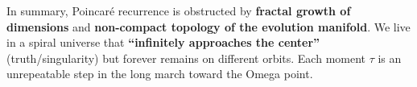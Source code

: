 In summary, Poincar\'{e} recurrence is obstructed by \textbf{fractal growth of dimensions} and \textbf{non-compact topology of the evolution manifold}. We live in a spiral universe that \textbf{``infinitely approaches the center''} (truth/singularity) but forever remains on different orbits. Each moment $\tau$ is an unrepeatable step in the long march toward the Omega point.
